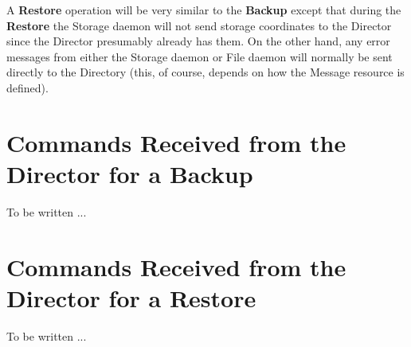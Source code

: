 A {\bf Restore} operation will be very similar to the {\bf Backup} except that
during the {\bf Restore} the Storage daemon will not send storage coordinates
to the Director since the Director presumably already has them. On the other
hand, any error messages from either the Storage daemon or File daemon will
normally be sent directly to the Directory (this, of course, depends on how
the Message resource is defined).

\section{Commands Received from the Director for a Backup}

To be written ...

\section{Commands Received from the Director for a Restore}

To be written ...
